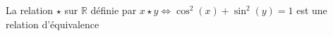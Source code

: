La relation $\star$ sur $\mathbb R$ définie par $x\star y \iff \cos^2(x)+\sin^2(y)=1$ est une relation d'équivalence

\begin{reponses}
\end{reponses}

